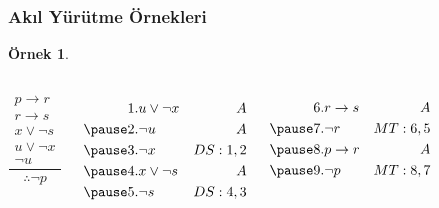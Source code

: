 \documentclass[dvipsnames]{beamer}
\theoremstyle{definition}
\theoremstyle{example}
\newtheorem{ornek}[theorem]{Örnek}
\theoremstyle{plain}
\begin{document}
\begin{frame}
  \frametitle{Akıl Yürütme Örnekleri}

  \begin{ornek}
    \begin{columns}[t]
      \[
      \frac
        {
          \begin{array}{c}
            p \rightarrow r\\
            r \rightarrow s\\
            x \vee \neg s\\
            u \vee \neg x\\
            \neg u
          \end{array}
        }
        {
          \therefore \neg p
        }
      \]

      \pause
      \begin{eqnarray*}
        1. & u \vee \neg x   & A\\
        \pause
        2. & \neg u          & A\\
        \pause
        3. & \neg x          & DS:1,2\\
        \pause
        4. & x \vee \neg s   & A\\
        \pause
        5. & \neg s          & DS:4,3\\
      \end{eqnarray*}

      \pause
      \begin{eqnarray*}
        6. & r \rightarrow s & A\\
        \pause
        7. & \neg r          & MT:6,5\\
        \pause
        8. & p \rightarrow r & A\\
        \pause
        9. & \neg p          & MT:8,7\\
      \end{eqnarray*}
    \end{columns}
  \end{ornek}
\end{frame}
\end{document}
